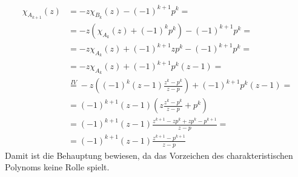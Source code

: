 \begin{enumerate}
\begin{itemize}
      \begin{equation*}
        \begin{split}
          \chi_{A_{k+1}}(z) &= -z \chi_{B_{k}}(z) - (-1)^{k+1}p^{k} = \\
          &= -z(\chi_{A_{k}}(z) + (-1)^{k}p^{k}) - (-1)^{k+1}p^{k} = \\
          &= -z \chi_{A_{k}}(z) + (-1)^{k+1}zp^{k} - (-1)^{k+1}p^{k} = \\
          &= -z \chi_{A_{k}}(z) + (-1)^{k+1}p^{k} (z - 1) = \\
          &\overset{IV}{=} -z ((-1)^{k}(z - 1)\frac{z^{k}-p^{k}}{z-p}) +
          (-1)^{k+1}p^{k}(z-1) = \\
          &= (-1)^{k+1} (z-1) (z \frac{z^{k}-p^{k}}{z-p} + p^{k}) \\
          &= (-1)^{k+1} (z-1) \frac{z^{k+1}-zp^{k}+zp^{k}-p^{k+1}}{z-p} = \\
          &= (-1)^{k+1} (z-1) \frac{z^{k+1}-p^{k+1}}{z-p} 
        \end{split}
      \end{equation*}
      Damit ist die Behauptung bewiesen, da das Vorzeichen des
      charakteristischen Polynoms keine Rolle spielt.


\end{itemize}
\end{enumerate}
